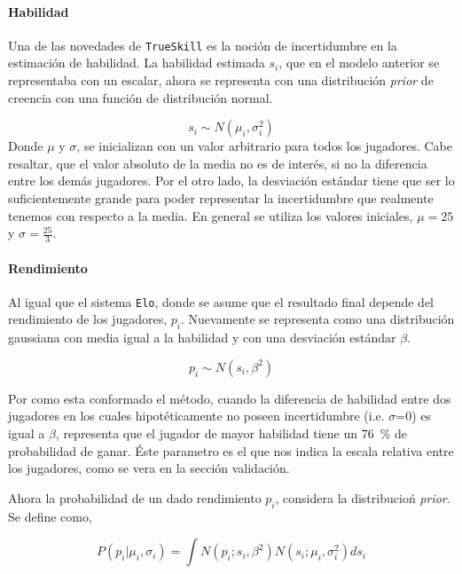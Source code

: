 \documentclass[11pt,twoside, spanish]{report} %
\begin{document}
\paragraph{Habilidad}
Una de las novedades de \texttt{TrueSkill} es la noci\'on de incertidumbre en la estimaci\'on de habilidad.
La habilidad estimada $s_i$, que en el modelo anterior se representaba con un escalar, ahora se representa con una distribuci\'on \textit{prior} de creencia con una funci\'on de distribuci\'on normal.

\begin{equation}
s_i \sim N(\mu_i, \sigma_i^2)
\end{equation}
Donde $\mu$ y $\sigma$, se inicializan con un valor arbitrario para todos los jugadores.
Cabe resaltar, que el valor absoluto de la media no es de inter\'es, si no la diferencia entre los dem\'as jugadores.
Por el otro lado, la desviaci\'on est\'andar tiene que ser lo suficientemente grande para poder representar la incertidumbre que realmente tenemos con respecto a la media.
En general se utiliza los valores iniciales, $ \mu = 25 $ y $ \sigma=\frac{25}{3} $.



\paragraph{Rendimiento}
Al igual que el sistema \texttt{Elo}, donde se asume que el resultado final depende del rendimiento de los jugadores, $p_i$.
Nuevamente se representa como una distribuci\'on gaussiana con media igual a la habilidad y con una desviaci\'on est\'andar $\beta$.

\begin{equation}
p_i \sim N(s_i, \beta^2)
\end{equation}

Por como esta conformado el m\'etodo, cuando la diferencia de habilidad entre dos jugadores en los cuales hipot\'eticamente no poseen incertidumbre (i.e. $\sigma$=0) es igual a $\beta$, representa que el jugador de mayor habilidad tiene un \SI{76}{\percent} de probabilidad de ganar.
\'Este parametro es el que nos indica la escala relativa entre los jugadores, como se vera en la secci\'on validaci\'on.

Ahora la probabilidad de un dado rendimiento $p_i$, considera la distribucio\'n  \textit{prior}.
Se define como,

\begin{equation}\label{eq:p.p_i}
P(p_i|\mu_i,\sigma_i) = \int N(p_i; s_i, \beta^2)N(s_i;\mu_i,\sigma_i^2) ds_i
\end{equation}
\end{document}

